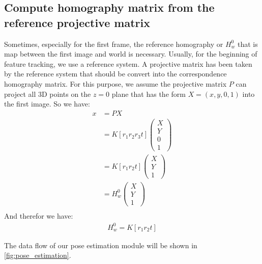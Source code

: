 \subsection{Compute homography matrix from the reference projective matrix}
Sometimes, especially for the first frame, the reference homography or $H_{w}^{0}$ that is map between the first image and world is necessary. Usually, for the beginning of feature tracking, we use a reference system. A projective matrix has been taken by the reference system that should be convert into the correspondence homography matrix. For this purpose, we assume the projective matrix $P$ can project all 3D points on the $z=0$ plane that has the form $X=(x,y,0,1)$ into the first image. So we have:
\begin{align*} 
x  &=  P X \\
   &=  K [r_{1}r_{2}r_{3}t] 
 \begin{pmatrix}
  X \\
  Y \\
  0 \\
  1
 \end{pmatrix} \\
  &=  K [r_{1}r_{2}t] \begin{pmatrix}
  X \\
  Y \\
  1
 \end{pmatrix} \\
  &=  H_{w}^{0} \begin{pmatrix}
  X \\
  Y \\
  1
 \end{pmatrix} \\
\end{align*}
And therefor we have:
\begin{gather*}
	H_{w}^{0} = K [r_{1}r_{2}t]
\end{gather*}\label{eq:homography_to_projective}

The data flow of our pose estimation module will be shown in \autoref{fig:pose_estimation}.

